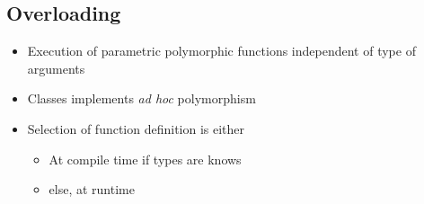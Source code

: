\subsection{Overloading}
\begin{itemize}
    \item Execution of parametric polymorphic functions independent  of type of arguments
    \item Classes implements \textit{ad hoc} polymorphism
    \item Selection of function definition is either
        \begin{itemize}
            \item At compile time if types are knows
            \item else, at runtime 
        \end{itemize}
\end{itemize}
